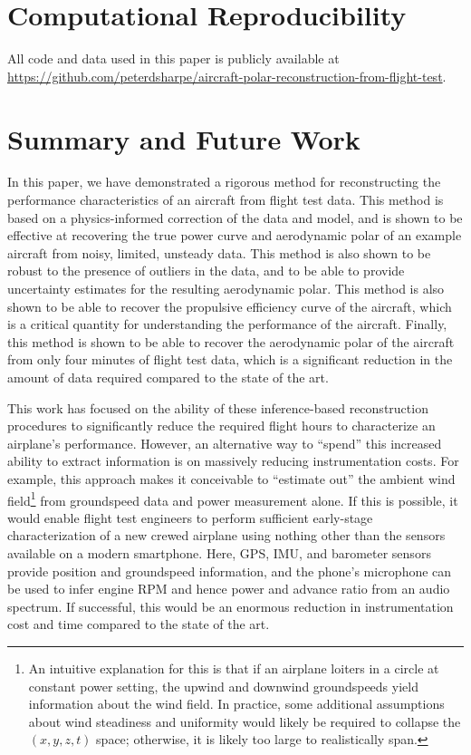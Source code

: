 \section{Computational Reproducibility}

All code and data used in this paper is publicly available at \url{https://github.com/peterdsharpe/aircraft-polar-reconstruction-from-flight-test}.


\section{Summary and Future Work}
\label{sec:sysid_conclusion}

In this paper, we have demonstrated a rigorous method for reconstructing the performance characteristics of an aircraft from flight test data. This method is based on a physics-informed correction of the data and model, and is shown to be effective at recovering the true power curve and aerodynamic polar of an example aircraft from noisy, limited, unsteady data. This method is also shown to be robust to the presence of outliers in the data, and to be able to provide uncertainty estimates for the resulting aerodynamic polar. This method is also shown to be able to recover the propulsive efficiency curve of the aircraft, which is a critical quantity for understanding the performance of the aircraft. Finally, this method is shown to be able to recover the aerodynamic polar of the aircraft from only four minutes of flight test data, which is a significant reduction in the amount of data required compared to the state of the art.

This work has focused on the ability of these inference-based reconstruction procedures to significantly reduce the required flight hours to characterize an airplane's performance. However, an alternative way to ``spend'' this increased ability to extract information is on massively reducing instrumentation costs. For example, this approach makes it conceivable to ``estimate out'' the ambient wind field\footnote{An intuitive explanation for this is that if an airplane loiters in a circle at constant power setting, the upwind and downwind groundspeeds yield information about the wind field. In practice, some additional assumptions about wind steadiness and uniformity would likely be required to collapse the $(x, y, z, t)$ space; otherwise, it is likely too large to realistically span.} from groundspeed data and power measurement alone. If this is possible, it would enable flight test engineers to perform sufficient early-stage characterization of a new crewed airplane using nothing other than the sensors available on a modern smartphone. Here, GPS, IMU, and barometer sensors provide position and groundspeed information, and the phone's microphone can be used to infer engine RPM and hence power and advance ratio from an audio spectrum. If successful, this would be an enormous reduction in instrumentation cost and time compared to the state of the art.

